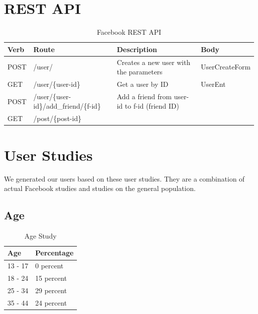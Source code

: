 \documentclass{article}
\begin{document}
\section*{REST API}
\begin{table}[H]
\centering
\begin{tabular}{|p{1cm}|p{5.5cm}|p{5.5cm}|p{2.53cm}|} 
 \hline
 Verb  & Route & Description  & Body\\ [0.5ex] \hline\hline
 POST  & /user/ & Creates a new user with the parameters & UserCreateForm\\ \hline
 GET & /user/\{user-id\} & Get a user by ID & UserEnt \\ \hline
 POST & /user/\{user-id\}/add\_friend/\{f-id\} & Add a friend from user-id to f-id (friend ID) &\\ \hline
 GET & /post/\{post-id\} &  & \\ [1ex] \hline
\end{tabular}
\caption{Facebook REST API}
\label{table:api}
\end{table}

\section*{User Studies}
We generated our users based on these user studies. They are a combination of actual Facebook studies and studies on the general population.
\subsection*{Age}
\begin{table}[H]
\centering
\begin{tabular}{|p{2cm}||p{2cm}|} 
 \hline
 Age & Percentage \\ [0.5ex] 
 \hline\hline
 13 - 17 & 0 percent \\
 \hline
 18 - 24 & 15 percent \\
 \hline
 25 - 34 & 29 percent \\
 \hline
 35 - 44 & 24 percent \\ [1ex] 
 \hline
\end{tabular}
\caption{Age Study \cite{sproutsocialwebsite}}
\label{table:1}
\end{table}
\end{document}
